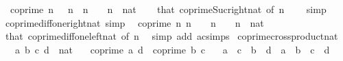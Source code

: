 \begin{isabellebody}
\ \ {\isachardoublequoteopen}coprime\ {\isacharparenleft}{\kern0pt}n\ {\isacharminus}{\kern0pt}\ {}{\isacharparenright}{\kern0pt}\ n{\isachardoublequoteclose}\ \ {\isachardoublequoteopen}n\ {\isachargreater}{\kern0pt}\ {}{\isachardoublequoteclose}\ \ n\ {\isacharcolon}{\kern0pt}{\isacharcolon}{\kern0pt}\ nat\isanewline
%
\isadelimproof
\ \ %
\endisadelimproof
%
\isatagproof
{}\isamarkupfalse%
\ that\ coprime{\isacharunderscore}{\kern0pt}Suc{\isacharunderscore}{\kern0pt}right{\isacharunderscore}{\kern0pt}nat\ {\isacharbrackleft}{\kern0pt}of\ {\isachardoublequoteopen}n\ {\isacharminus}{\kern0pt}\ {}{\isachardoublequoteclose}{\isacharbrackright}{\kern0pt}\ \isamarkupfalse%
\ simp%
\endisatagproof
{\isafoldproof}%
%
\isadelimproof
\isanewline
%
\endisadelimproof
\isanewline
{}\isamarkupfalse%
\ coprime{\isacharunderscore}{\kern0pt}diff{\isacharunderscore}{\kern0pt}one{\isacharunderscore}{\kern0pt}right{\isacharunderscore}{\kern0pt}nat\ {\isacharbrackleft}{\kern0pt}simp{\isacharbrackright}{\kern0pt}{\isacharcolon}{\kern0pt}\isanewline
\ \ {\isachardoublequoteopen}coprime\ n\ {\isacharparenleft}{\kern0pt}n\ {\isacharminus}{\kern0pt}\ {}{\isacharparenright}{\kern0pt}{\isachardoublequoteclose}\ \ {\isachardoublequoteopen}n\ {\isachargreater}{\kern0pt}\ {}{\isachardoublequoteclose}\ \ n\ {\isacharcolon}{\kern0pt}{\isacharcolon}{\kern0pt}\ nat\isanewline
%
\isadelimproof
\ \ %
\endisadelimproof
%
\isatagproof
{}\isamarkupfalse%
\ that\ coprime{\isacharunderscore}{\kern0pt}diff{\isacharunderscore}{\kern0pt}one{\isacharunderscore}{\kern0pt}left{\isacharunderscore}{\kern0pt}nat\ {\isacharbrackleft}{\kern0pt}of\ n{\isacharbrackright}{\kern0pt}\ \isamarkupfalse%
\ {\isacharparenleft}{\kern0pt}simp\ add{\isacharcolon}{\kern0pt}\ ac{\isacharunderscore}{\kern0pt}simps{\isacharparenright}{\kern0pt}%
\endisatagproof
{\isafoldproof}%
%
\isadelimproof
\isanewline
%
\endisadelimproof
\isanewline
{}\isamarkupfalse%
\ coprime{\isacharunderscore}{\kern0pt}crossproduct{\isacharunderscore}{\kern0pt}nat{\isacharcolon}{\kern0pt}\isanewline
\ \ \ a\ b\ c\ d\ {\isacharcolon}{\kern0pt}{\isacharcolon}{\kern0pt}\ nat\isanewline
\ \ \ {\isachardoublequoteopen}coprime\ a\ d{\isachardoublequoteclose}\ \ {\isachardoublequoteopen}coprime\ b\ c{\isachardoublequoteclose}\isanewline
\ \ \ {\isachardoublequoteopen}a\ {\isacharasterisk}{\kern0pt}\ c\ {\isacharequal}{\kern0pt}\ b\ {\isacharasterisk}{\kern0pt}\ d\ {\isasymlongleftrightarrow}\ a\ {\isacharequal}{\kern0pt}\ b\ {\isasymand}\ c\ {\isacharequal}{\kern0pt}\ d{\isachardoublequoteclose}\isanewline

\end{isabellebody}
